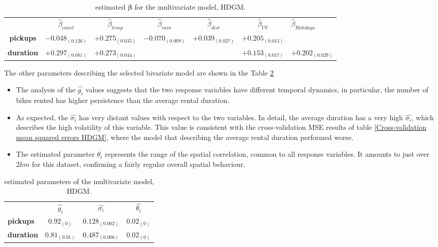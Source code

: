 \begin{table}
	\centering
	\renewcommand\arraystretch{1.3}
	\begin{tabular}{|ccccccl}
		\hline
		& $\hat{\beta}_{const}$  & $\hat{\beta}_{temp}$ & $\hat{\beta}_{rain}$ & $\hat{\beta}_{dist}$ & $\hat{\beta}_{UV}$ &$\hat{\beta}_{Holidays}$      \\ \cline{2-7} 
		\multicolumn{1}{|c|}{\textbf{pickups}}  & $-0.048_{(0.126)}$ & $+0.275_{(0.035)}$ & $-0.070_{(0.009)}$ & $+0.039_{(0.027)}$ & $+0.205_{(0.013)}$ &              \\
		\multicolumn{1}{|c|}{\textbf{duration}} & $+0.297_{(0.081)}$  & $+0.273_{(0.044)}$ &               &               & $+0.153_{(0.017)}$  & $+0.202_{(0.029)}$
	\end{tabular}
	\caption[Estimated $\boldsymbol{\beta}$ for the multivariate model (HDGM)]{estimated $\boldsymbol{\beta}$ for the multivariate model, HDGM.}
	\label{Bivariate Beta HDGM}
\end{table}

The other parameters describing the selected bivariate model are shown in the Table \ref{Bivariate Param_HDGM}
\begin{itemize}
	\item The analysis of the $\hat{g_i}$ values suggests that the two response variables have different temporal dynamics, in particular, the number of bikes rented has higher persistence than the average rental duration. 
	\item As expected, the $\hat{\sigma_i}$ has very distant values with respect to the two variables. In detail, the average duration has a very high $\hat{\sigma_i}$, which describes the high volatility of this variable. This value is consistent with the cross-validation MSE results of table \ref{Cross-validation mean squared errors HDGM}, where the model that describing the average rental duration performed worse.
	\item  The estimated parameter $\theta_i$ represents the range of the spatial correlation, common to all response variables. It amounts to just over $2 km$ for this dataset, confirming a fairly regular overall spatial behaviour.
\end{itemize}

\begin{table}
	\centering
	\renewcommand\arraystretch{1.3}
	\begin{tabular}{|cccc}
		\hline
		& $\hat{g_i}$  & $\hat{\sigma_i}$ & $\hat{\theta_i}$  \\ \cline{2-4} 
		\multicolumn{1}{|l|}{\textbf{pickups}}  &  $0.92_{(0)}$ &  $0.128_{(0.002)}$ & \multicolumn{1}{c}{$0.02_{(0)}$ } \\
		\multicolumn{1}{|l|}{\textbf{duration}} &  $0.81_{(0.01)}$ &  $0.487_{(0.006)}$ &     $0.02_{(0)}$                              
	\end{tabular}
	\caption[Estimated parameters of the multivariate model (HDGM)]{estimated parameters of the multivariate model, HDGM.}
	\label{Bivariate Param_HDGM}
\end{table}